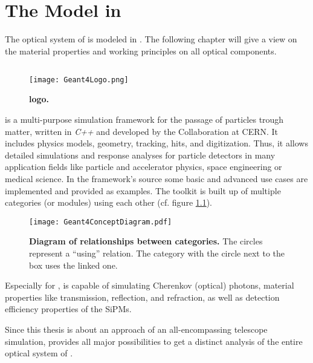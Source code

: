\chapter{The \iceact Model in \geant}

The optical system of \iceact is modeled in \geant. The following chapter will give a view on the material properties and working principles on all optical components.

\section{\geant}

\begin{wrapfigure}{r}{0.5\textwidth}
	\centering
	\texttt{[image: Geant4Logo.png]}
	\caption[\geant logo]{\textbf{\geant logo.} \cite{geant4:logo}}	
\end{wrapfigure}
\geant is a multi-purpose simulation framework for the passage of particles trough matter, written in \textit{C++} and developed by the \geant Collaboration at CERN. It includes physics models, geometry, tracking, hits, and digitization. Thus, it allows detailed simulations and response analyses for particle detectors in many application fields like particle and accelerator physics, space engineering or medical science. In the framework's source some basic and advanced use cases are implemented and provided as examples. The toolkit is built up of multiple categories (or modules) using each other (cf. figure \ref{geant4:categories}).~\cite{geant4}

\begin{figure}[H]
	\centering
	\texttt{[image: Geant4ConceptDiagram.pdf]}
	\caption[\geant category diagram]{\textbf{Diagram of relationships between \geant categories.} \cite[adapted]{geant4} The circles represent a \enquote{using} relation. The category with the circle next to the box uses the linked one.}	
	\label{geant4:categories}
\end{figure}

Especially for \iceact, \geant is capable of simulating Cherenkov (optical) photons, material properties like transmission, reflection, and refraction, as well as detection efficiency properties of the SiPMs.

Since this thesis is about an approach of an all-encompassing telescope simulation, \geant provides all major possibilities to get a distinct analysis of the entire optical system of \iceact.

